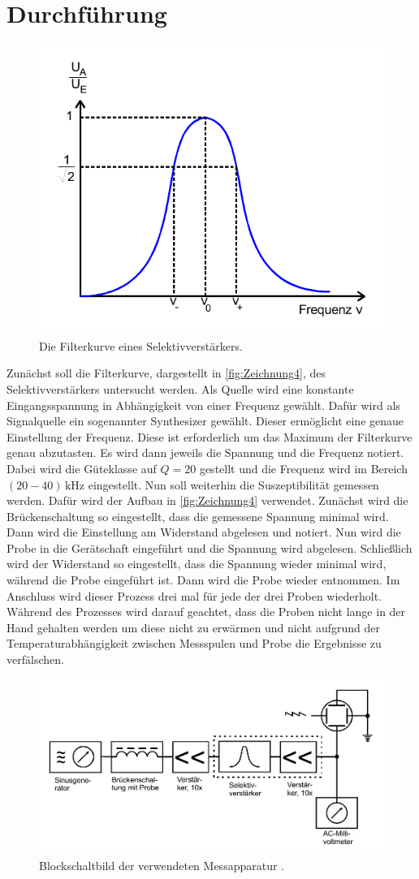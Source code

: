 \section{Durchführung}
\label{sec:Durchführung}
\begin{figure}[H]
    \centering
    \includegraphics[width=0.5\linewidth]{pictures/Zeichnung3.pdf}
    \caption{Die Filterkurve eines Selektivverstärkers. \cite{v606}}
    \label{fig:Zeichnung3}
\end{figure}
Zunächst soll die Filterkurve, dargestellt in \autoref{fig:Zeichnung4}, des Selektivverstärkers untersucht werden.
Als Quelle wird eine konstante Eingangsspannung in Abhängigkeit von einer Frequenz gewählt.
Dafür wird als Signalquelle ein sogenannter Synthesizer gewählt.
Dieser ermöglicht eine genaue Einstellung der Frequenz.
Diese ist erforderlich um das Maximum der Filterkurve genau abzutasten.
Es wird dann jeweils die Spannung und die Frequenz notiert.
Dabei wird die Güteklasse auf $Q = 20$ gestellt und die Frequenz wird im Bereich $(20 - 40) \, \unit{\kilo\hertz}$ eingestellt.
Nun soll weiterhin die Suszeptibilität gemessen werden.
Dafür wird der Aufbau in \autoref{fig:Zeichnung4} verwendet.
Zunächst wird die Brückenschaltung so eingestellt, dass die gemessene Spannung minimal wird.
Dann wird die Einstellung am Widerstand abgelesen und notiert.
Nun wird die Probe in die Gerätschaft eingeführt und die Spannung wird abgelesen.
Schließlich wird der Widerstand so eingestellt, dass die Spannung wieder minimal wird, während die Probe eingeführt ist.
Dann wird die Probe wieder entnommen.
Im Anschluss wird dieser Prozess drei mal für jede der drei Proben wiederholt.
Während des Prozesses wird darauf geachtet, dass die Proben nicht lange in der Hand gehalten werden um diese nicht zu erwärmen
und nicht aufgrund der Temperaturabhängigkeit zwischen Messspulen und Probe die Ergebnisse zu verfälschen.

\begin{figure}
    \centering
    \includegraphics[width=\linewidth]{pictures/Zeichnung4.pdf}
    \caption{Blockschaltbild der verwendeten Messapparatur \cite{v606}.}
    \label{fig:Zeichnung4}
\end{figure}